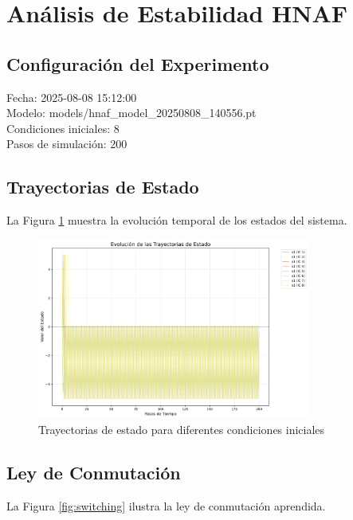 \section{Análisis de Estabilidad HNAF}

\subsection{Configuración del Experimento}
Fecha: 2025-08-08 15:12:00\\Modelo: models/hnaf_model_20250808_140556.pt\\Condiciones iniciales: 8\\Pasos de simulación: 200

\subsection{Trayectorias de Estado}
La Figura \ref{fig:trajectories} muestra la evolución temporal de los estados del sistema.

\begin{figure}[h]
\centering
\includegraphics[width=0.8\textwidth]{plot_trajectories.png}
\caption{Trayectorias de estado para diferentes condiciones iniciales}
\label{fig:trajectories}
\end{figure}

\subsection{Ley de Conmutación}
La Figura \ref{fig:switching} ilustra la ley de conmutación aprendida.

